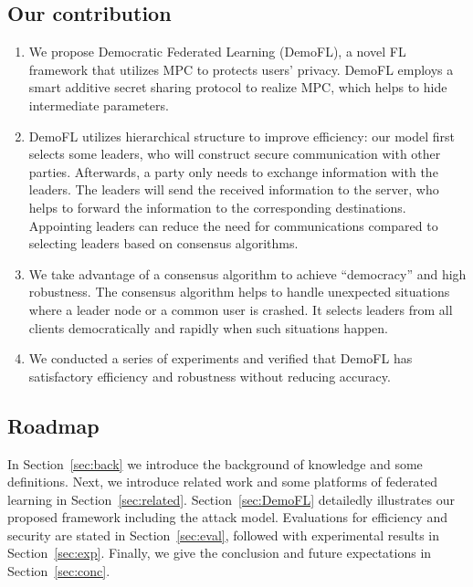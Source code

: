 \subsection{Our contribution}
\begin{enumerate}
    \item We propose Democratic Federated Learning (DemoFL), a novel FL framework that utilizes MPC to protects users' privacy. DemoFL employs a smart additive secret sharing protocol to realize MPC, which helps to hide intermediate parameters.

    \item DemoFL utilizes hierarchical structure to improve efficiency: our model first selects some leaders, who will construct secure communication with other parties. Afterwards, a party only needs to exchange information with the leaders. The leaders will send the received information to the server, who helps to forward the information to the corresponding destinations. Appointing leaders can reduce the need for communications compared to selecting leaders based on consensus algorithms.

    \item We take advantage of a consensus algorithm to achieve ``democracy'' and high robustness. The consensus algorithm helps to handle unexpected situations where a leader node or a common user is crashed. It selects leaders from all clients democratically and rapidly when such situations happen.

    \item We conducted a series of experiments and verified that DemoFL has satisfactory efficiency and robustness without reducing accuracy.

\end{enumerate}

\subsection{Roadmap} In Section~\ref{sec:back} we introduce the background of knowledge and some definitions. Next, we introduce related work and some platforms of federated learning in Section~\ref{sec:related}. Section~\ref{sec:DemoFL} detailedly illustrates our proposed framework including the attack model. Evaluations for efficiency and security are stated in Section~\ref{sec:eval}, followed with experimental results in Section~\ref{sec:exp}. Finally, we give the conclusion and future expectations in Section~\ref{sec:conc}.